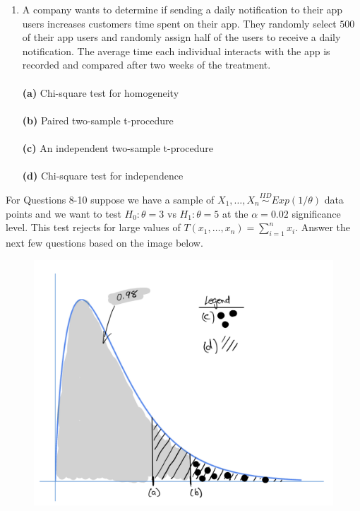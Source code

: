 \documentclass[12pt]{article}
\begin{document}
\begin{enumerate}[leftmargin=\labelsep]
\item A company wants to determine if sending a daily notification to their app users increases customers time spent on their app. They randomly select $500$ of their app users and randomly assign half of the users to receive a daily notification. The average time each individual interacts with the app is recorded and compared after two weeks of the treatment.\\
\vspace{1mm}\\
{\bf (a)} \hspace{2mm} Chi-square test for homogeneity\\ \vspace{1mm}\\
{\bf (b)} \hspace{2mm} Paired two-sample t-procedure\\   \vspace{1mm}\\
{\bf (c)} \hspace{2mm} An independent two-sample t-procedure\\ \vspace{1mm}\\  
{\bf (d)} \hspace{2mm} Chi-square test for independence\\
\end{enumerate}



\noindent For Questions 8-10 suppose we have a sample of $X_1,\dots,X_n \stackrel{IID}{\sim} Exp(1/\theta)$ data points and we want to test $H_0: \theta=3$ vs $H_1: \theta=5$ at the $\alpha=0.02$ significance level. This test rejects for large values of $T(x_1, \dots, x_n) = \sum_{i=1}^{n}x_i$. Answer the next few questions based on the image below. 


\begin{figure}[h]
\centering
\includegraphics[width=0.7\linewidth]{Stat 61 final.png}
\end{figure}	
\end{document}
